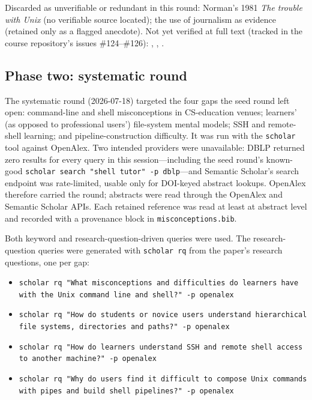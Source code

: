 Discarded as unverifiable or redundant in this round: Norman's 1981
\emph{The trouble with Unix} (no verifiable source located); the use of
journalism \autocite{Chin2021FileNotFound} as evidence (retained only as a
flagged anecdote).
Not yet verified at full text (tracked in the course repository's issues
\#124--\#126): \autocite{DuBoulay1981BlackBox},
\autocite{BenAri1998Constructivism}, \autocite{Dillon2012MentalModels}.

\subsection{Phase two: systematic round}

The systematic round (2026-07-18) targeted the four gaps the seed round left
open: command-line and shell misconceptions in CS-education venues; learners'
(as opposed to professional users') file-system mental models; SSH and
remote-shell learning; and pipeline-construction difficulty.
It was run with the \texttt{scholar} tool against OpenAlex.
Two intended providers were unavailable: DBLP returned zero results for every
query in this session---including the seed round's known-good
\texttt{scholar search "shell tutor" -p dblp}---and Semantic Scholar's search
endpoint was rate-limited, usable only for DOI-keyed abstract lookups.
OpenAlex therefore carried the round; abstracts were read through the
OpenAlex and Semantic Scholar APIs.
Each retained reference was read at least at abstract level and recorded with
a provenance block in \texttt{misconceptions.bib}.

Both keyword and research-question-driven queries were used.
The research-question queries were generated with \texttt{scholar rq} from the
paper's research questions, one per gap:

\begin{itemize}
  \item \texttt{scholar rq "What misconceptions and difficulties do learners
    have with the Unix command line and shell?" -p openalex}
  \item \texttt{scholar rq "How do students or novice users understand
    hierarchical file systems, directories and paths?" -p openalex}
  \item \texttt{scholar rq "How do learners understand SSH and remote shell
    access to another machine?" -p openalex}
  \item \texttt{scholar rq "Why do users find it difficult to compose Unix
    commands with pipes and build shell pipelines?" -p openalex}
\end{itemize}

